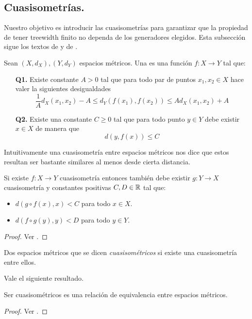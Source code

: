\documentclass[tesis.tex]{subfiles}
\begin{document}
\subsection{Cuasisometrías.}

Nuestro objetivo es introducir las cuasisometrías para garantizar que la propiedad de tener treewidth finito no dependa de los generadores elegidos.
Esta subsección sigue los textos de \cite{bridson2013metric} y de \cite{loh2017geometric}.

\begin{deff}
	Sean $(X,d_X),(Y,d_Y)$ espacios métricos. 
	Una  es una función $f:X \to Y$ tal que:
	\begin{itemize}
		\item[\textbf{Q1.}] Existe constante $A > 0$ tal que para todo par de puntos $x_1,x_2 \in X$ hace valer la siguientes desigualdades
		\[
		\frac{1}{A} d_X(x_1,x_2) - A \le d_Y(f(x_1),f(x_2)) \le A d_X(x_1,x_2) + A
		\]
		\item[\textbf{Q2.}] Existe una constante $C \ge 0$ tal que para todo punto $y \in Y$ debe existir $x \in X$ de manera que 
		\[
		d(y,f(x)) \le C
		\]
	\end{itemize}
\end{deff}

Intuitivamente una cuasisometría entre espacios métricos nos dice que estos resultan ser bastante similares al menos desde cierta distancia. 
\medskip
\begin{prop}
	Si existe $f:X \to Y$ cuasisometría entonces también debe existir $g:Y \to X$ cuasisometría y constantes positivas $C,D \in \mathbb{R}$ tal que:
	\begin{itemize}
		\item $d(g \circ f (x), x) < C$ para todo $x \in X$.
		\item $d(f \circ g (y), y) < D$ para todo $y \in Y$. 
	\end{itemize}
\end{prop}
\begin{proof}
	Ver \cite{loh2017geometric}.
\end{proof}

\begin{deff}
	Dos espacios métricos que se dicen \emph{cuasisométricos} si existe una cuasisometría entre ellos.
\end{deff}

Vale el siguiente resultado.
\begin{prop}
	Ser cuasisométricos es una relación de equivalencia entre espacios métricos.
\end{prop}
\begin{proof}
	Ver \cite{loh2017geometric}.
\end{proof}
\end{document}
